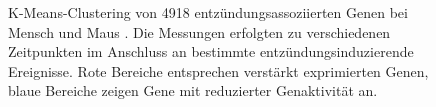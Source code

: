 \documentclass[a4paper,12pt,twoside]{article}
\begin{document}
\begin{figure}[!htb]
	\centering
	\null\hfill
	\caption{
		K-Means-Clustering von 4918 entzündungsassoziierten Genen bei Mensch und Maus \citep{Seok2013}. Die Messungen erfolgten zu verschiedenen Zeitpunkten im Anschluss an bestimmte entzündungsinduzierende Ereignisse. Rote Bereiche entsprechen verstärkt exprimierten Genen, blaue Bereiche zeigen Gene mit reduzierter Genaktivität an.
	}
	\label{hmb}
\end{figure}
\clearpage


\newpage


\end{document}
